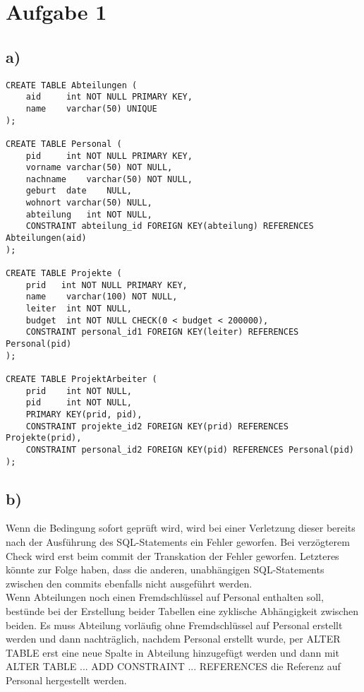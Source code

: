 \documentclass[a4paper,12pt,]{scrartcl}
\begin{document}
\section*{Aufgabe 1}
\subsection*{a)}
\begin{verbatim}
CREATE TABLE Abteilungen (
    aid     int NOT NULL PRIMARY KEY,
    name    varchar(50) UNIQUE
);

CREATE TABLE Personal (
    pid     int NOT NULL PRIMARY KEY,
    vorname varchar(50) NOT NULL,
    nachname    varchar(50) NOT NULL,
    geburt  date    NULL,
    wohnort varchar(50) NULL,
    abteilung   int NOT NULL,
    CONSTRAINT abteilung_id FOREIGN KEY(abteilung) REFERENCES Abteilungen(aid)
);

CREATE TABLE Projekte (
    prid   int NOT NULL PRIMARY KEY,
    name    varchar(100) NOT NULL,
    leiter  int NOT NULL,
    budget  int NOT NULL CHECK(0 < budget < 200000),
    CONSTRAINT personal_id1 FOREIGN KEY(leiter) REFERENCES Personal(pid)
);

CREATE TABLE ProjektArbeiter (
    prid    int NOT NULL,
    pid     int NOT NULL,
    PRIMARY KEY(prid, pid),
    CONSTRAINT projekte_id2 FOREIGN KEY(prid) REFERENCES Projekte(prid),
    CONSTRAINT personal_id2 FOREIGN KEY(pid) REFERENCES Personal(pid)
);

\end{verbatim}

\newpage
\subsection*{b)}
Wenn die Bedingung sofort geprüft wird, wird bei einer Verletzung dieser
bereits nach der Ausführung des SQL-Statements ein Fehler geworfen. Bei
verzögterem Check wird erst beim commit der Transkation der Fehler geworfen.
Letzteres könnte zur Folge haben, dass die anderen, unabhängigen
SQL-Statements zwischen den commits ebenfalls nicht ausgeführt werden.\\
Wenn Abteilungen noch einen Fremdschlüssel auf Personal enthalten soll,
bestünde bei der Erstellung beider Tabellen eine zyklische Abhängigkeit zwischen beiden.
Es muss Abteilung vorläufig ohne Fremdschlüssel auf Personal erstellt werden
und dann nachträglich, nachdem Personal erstellt wurde, per ALTER TABLE erst
eine neue Spalte in Abteilung hinzugefügt werden und dann mit ALTER
TABLE ... ADD CONSTRAINT ... REFERENCES die Referenz auf Personal hergestellt
werden.
\end{document}
